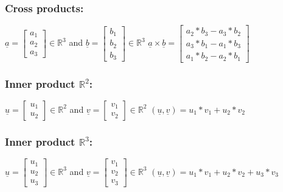 \subsubsection{Cross products:}
$\underline{a} = \begin{bmatrix} a_1 \\ a_2 \\ a_3 \end{bmatrix} \in \mathbb{R}^3$ and $\underline{b} = \begin{bmatrix} b_1 \\ b_2 \\ b_3 \end{bmatrix} \in \mathbb{R}^3 $
\newline
$\underline{a} \times \underline{b} = \begin{bmatrix} a_2 * b_3 - a_3 * b_2 \\ a_3 * b_1 - a_1 * b_3 \\ a_1 * b_2 - a_2 * b_1 \end{bmatrix}$

\subsubsection{Inner product $\mathbb{R}^2$:}
$\underline{u} = \begin{bmatrix} u_1 \\ u_2 \end{bmatrix} \in \mathbb{R}^2$ and $\underline{v} = \begin{bmatrix} v_1 \\ v_2 \end{bmatrix} \in \mathbb{R}^2 $
\newline
$(\underline{u} , \underline{v}) = u_1 * v_1 + u_2 * v_2$

\subsubsection{Inner product $\mathbb{R}^3$:}
$\underline{u} = \begin{bmatrix} u_1 \\ u_2 \\ u_3 \end{bmatrix} \in \mathbb{R}^3$ and $\underline{v} = \begin{bmatrix} v_1 \\ v_2 \\ v_3 \end{bmatrix} \in \mathbb{R}^3 $
\newline
$(\underline{u} , \underline{v}) = u_1 * v_1 + u_2 * v_2 + u_3 * v_3$

